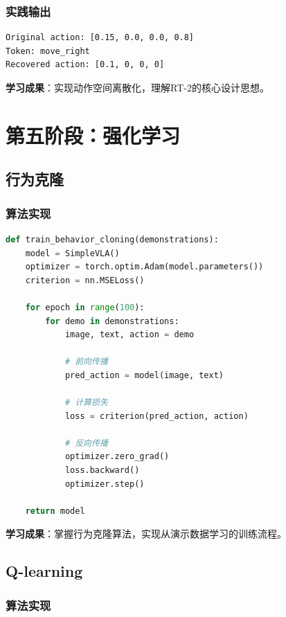 \documentclass[12pt,a4paper]{article}
\begin{document}
\subsubsection{实践输出}

\begin{verbatim}
Original action: [0.15, 0.0, 0.0, 0.8]
Token: move_right
Recovered action: [0.1, 0, 0, 0]
\end{verbatim}

\textbf{学习成果}：实现动作空间离散化，理解RT-2的核心设计思想。

\section{第五阶段：强化学习}

\subsection{行为克隆}

\subsubsection{算法实现}

\begin{lstlisting}[language=Python]
def train_behavior_cloning(demonstrations):
    model = SimpleVLA()
    optimizer = torch.optim.Adam(model.parameters())
    criterion = nn.MSELoss()
    
    for epoch in range(100):
        for demo in demonstrations:
            image, text, action = demo
            
            # 前向传播
            pred_action = model(image, text)
            
            # 计算损失
            loss = criterion(pred_action, action)
            
            # 反向传播
            optimizer.zero_grad()
            loss.backward()
            optimizer.step()
    
    return model
\end{lstlisting}

\textbf{学习成果}：掌握行为克隆算法，实现从演示数据学习的训练流程。

\subsection{Q-learning}

\subsubsection{算法实现}
\end{document}

